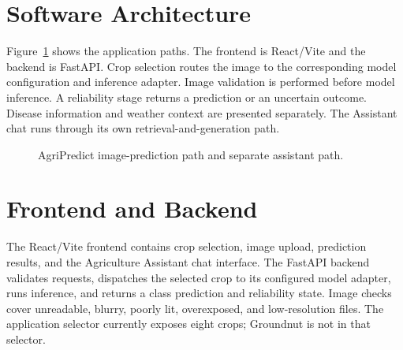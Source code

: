 \documentclass[12pt,a4paper,oneside]{report}
\begin{document}
\section{Software Architecture}
Figure~\ref{fig:system} shows the application paths. The frontend is React/Vite and the backend is FastAPI. Crop selection routes the image to the corresponding model configuration and inference adapter. Image validation is performed before model inference. A reliability stage returns a prediction or an uncertain outcome. Disease information and weather context are presented separately. The Assistant chat runs through its own retrieval-and-generation path.
\begin{figure}[H]\centering{}\caption{AgriPredict image-prediction path and separate assistant path.}\label{fig:system}\end{figure}
\section{Frontend and Backend}
The React/Vite frontend contains crop selection, image upload, prediction results, and the Agriculture Assistant chat interface. The FastAPI backend validates requests, dispatches the selected crop to its configured model adapter, runs inference, and returns a class prediction and reliability state. Image checks cover unreadable, blurry, poorly lit, overexposed, and low-resolution files. The application selector currently exposes eight crops; Groundnut is not in that selector.
\end{document}
